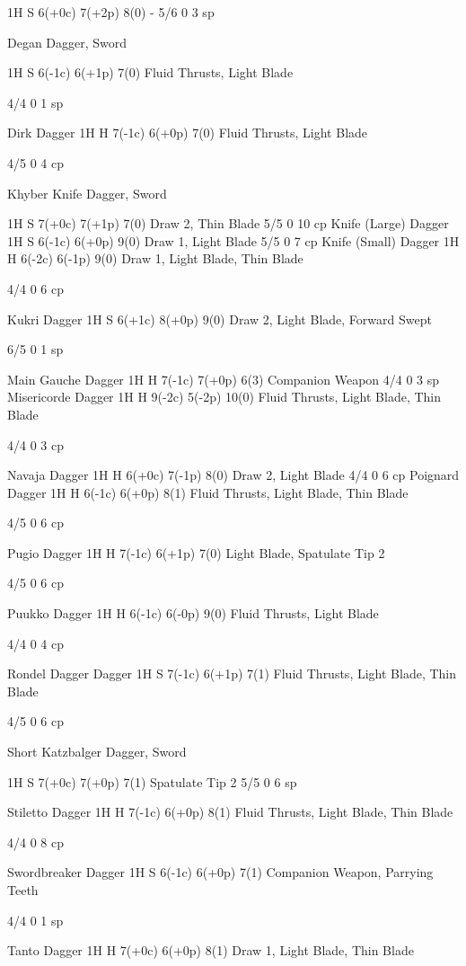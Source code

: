 \documentclass[oneside,11pt,english]{book}
\begin{document}
1H S 6(+0c) 7(+2p) 8(0) - 5/6 0 3 sp 

Degan Dagger, 
Sword 

1H S 6(-1c) 6(+1p) 7(0) Fluid Thrusts, Light 
Blade 

4/4 0 1 sp 

Dirk Dagger 1H H 7(-1c) 6(+0p) 7(0) Fluid Thrusts, Light 
Blade 

4/5 0 4 cp 

Khyber Knife Dagger, 
Sword 

1H S 7(+0c) 7(+1p) 7(0) Draw 2, Thin Blade 5/5 0 10 
cp 
Knife (Large) Dagger 1H S 6(-1c) 6(+0p) 9(0) Draw 1, Light Blade 5/5 0 7 cp 
Knife (Small) Dagger 1H H 6(-2c) 6(-1p) 9(0) Draw 1, Light Blade, 
Thin Blade 

4/4 0 6 cp 

Kukri Dagger 1H S 6(+1c) 8(+0p) 9(0) Draw 2, Light Blade, 
Forward Swept 

6/5 0 1 sp 

Main Gauche Dagger 1H H 7(-1c) 7(+0p) 6(3) Companion Weapon 4/4 0 3 sp 
Misericorde Dagger 1H H 9(-2c) 5(-2p) 10(0) Fluid Thrusts, Light 
Blade, Thin Blade 

4/4 0 3 cp 

Navaja Dagger 1H H 6(+0c) 7(-1p) 8(0) Draw 2, Light Blade 4/4 0 6 cp 
Poignard Dagger 1H H 6(-1c) 6(+0p) 8(1) Fluid Thrusts, Light 
Blade, Thin Blade 

4/5 0 6 cp 

Pugio Dagger 1H H 7(-1c) 6(+1p) 7(0) Light Blade, Spatulate 
Tip 2 

4/5 0 6 cp 

Puukko Dagger 1H H 6(-1c) 6(-0p) 9(0) Fluid Thrusts, Light 
Blade 

4/4 0 4 cp 

Rondel Dagger Dagger 1H S 7(-1c) 6(+1p) 7(1) Fluid Thrusts, Light 
Blade, Thin Blade 

4/5 0 6 cp 


Short Katzbalger Dagger, 
Sword 

1H S 7(+0c) 7(+0p) 7(1) Spatulate Tip 2 5/5 0 6 sp 

Stiletto Dagger 1H H 7(-1c) 6(+0p) 8(1) Fluid Thrusts, Light 
Blade, Thin Blade 

4/4 0 8 cp 

Swordbreaker Dagger 1H S 6(-1c) 6(+0p) 7(1) Companion Weapon, 
Parrying Teeth 

4/4 0 1 sp 

Tanto Dagger 1H H 7(+0c) 6(+0p) 8(1) Draw 1, Light Blade, 
Thin Blade 
\end{document}
